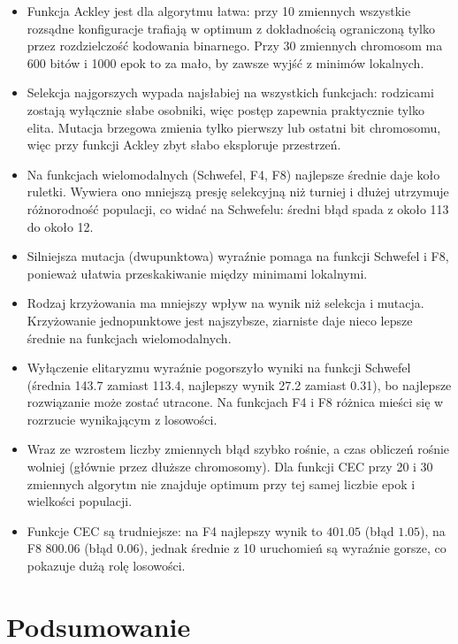 \documentclass[11pt,a4paper]{article}
\begin{document}
\begin{itemize}
  \item Funkcja Ackley jest dla algorytmu łatwa: przy 10 zmiennych wszystkie rozsądne konfiguracje
        trafiają w optimum z dokładnością ograniczoną tylko przez rozdzielczość kodowania binarnego.
        Przy 30 zmiennych chromosom ma 600 bitów i 1000 epok to za mało, by zawsze wyjść z minimów lokalnych.
  \item Selekcja najgorszych wypada najsłabiej na wszystkich funkcjach: rodzicami zostają wyłącznie
        słabe osobniki, więc postęp zapewnia praktycznie tylko elita. Mutacja brzegowa zmienia tylko
        pierwszy lub ostatni bit chromosomu, więc przy funkcji Ackley zbyt słabo eksploruje przestrzeń.
  \item Na funkcjach wielomodalnych (Schwefel, F4, F8) najlepsze średnie daje koło ruletki. Wywiera
        ono mniejszą presję selekcyjną niż turniej i dłużej utrzymuje różnorodność populacji, co
        widać na Schwefelu: średni błąd spada z około 113 do około 12.
  \item Silniejsza mutacja (dwupunktowa) wyraźnie pomaga na funkcji Schwefel i F8, ponieważ
        ułatwia przeskakiwanie między minimami lokalnymi.
  \item Rodzaj krzyżowania ma mniejszy wpływ na wynik niż selekcja i mutacja. Krzyżowanie
        jednopunktowe jest najszybsze, ziarniste daje nieco lepsze średnie na funkcjach wielomodalnych.
  \item Wyłączenie elitaryzmu wyraźnie pogorszyło wyniki na funkcji Schwefel (średnia 143.7 zamiast 113.4,
        najlepszy wynik 27.2 zamiast 0.31), bo najlepsze rozwiązanie może zostać utracone. Na funkcjach
        F4 i F8 różnica mieści się w rozrzucie wynikającym z losowości.
  \item Wraz ze wzrostem liczby zmiennych błąd szybko rośnie, a czas obliczeń rośnie wolniej
        (głównie przez dłuższe chromosomy). Dla funkcji CEC przy 20 i 30 zmiennych algorytm
        nie znajduje optimum przy tej samej liczbie epok i wielkości populacji.
  \item Funkcje CEC są trudniejsze: na F4 najlepszy wynik to $401.05$ (błąd $1.05$), na F8 $800.06$
        (błąd $0.06$), jednak średnie z 10 uruchomień są wyraźnie gorsze, co pokazuje dużą rolę losowości.
\end{itemize}

\section{Podsumowanie}
\end{document}
